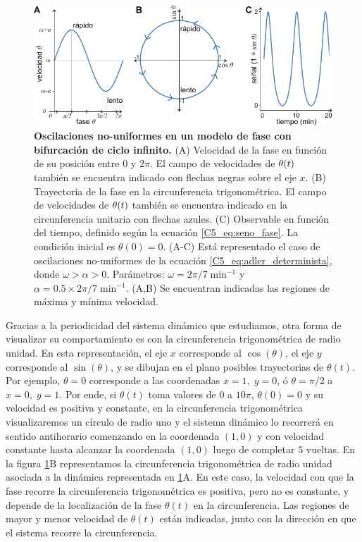\documentclass[./main.tex]{subfiles}
\begin{document}
\begin{figure}
    \centering
    \includegraphics[width=1\columnwidth]{figures/chapter5/C5_determinista_oscilatorio.pdf} 
    \caption{\textbf{Oscilaciones no-uniformes en un modelo de fase con bifurcación de ciclo infinito.} (A) Velocidad de la fase en función de su posición entre $0$ y $2\pi$. El campo de velocidades de $\theta(t)$ también se encuentra indicado con flechas negras sobre el eje $x$. (B) Trayectoria de la fase en la circunferencia trigonométrica. El campo de velocidades de $\theta(t)$ también se encuentra indicado en la circunferencia unitaria con flechas azules. (C) Observable en función del tiempo, definido según la ecuación \ref{C5_eq:seno_fase}. La condición inicial es $\theta(0)= 0$. (A-C) Está representado el caso de oscilaciones no-uniformes de la ecuación \ref{C5_eq:adler_determinista}, donde $\omega > \alpha > 0$. Parámetros: $\omega =2\pi/7 \; \text{min}^{-1}$ y  $\alpha = 0.5 \times 2\pi/7 \; \text{min}^{-1}$. (A,B) Se encuentran indicadas las regiones de máxima y mínima velocidad.}
    \label{C5_fig:adler_determinista_oscilatorio}
\end{figure}


Gracias a la periodicidad del sistema dinámico que estudiamos, otra forma de visualizar su comportamiento es con la circunferencia trigonométrica de radio unidad. En esta representación, el eje $x$ corresponde al $\cos{(\theta)}$, el eje $y$ corresponde al $\sin{(\theta)}$, y se dibujan en el plano posibles trayectorias de $\theta(t)$. Por ejemplo, $\theta = 0$ corresponde a las coordenadas $x=1, \; y=0$, ó $\theta = \pi/2$ a $x=0, \; y=1$. Por ende, si $\theta(t)$ toma valores de $0$ a $10\pi$, $\theta(0) = 0$ y su velocidad es positiva y constante, en la circunferencia trigonométrica visualizaremos un círculo de radio uno y el sistema dinámico lo recorrerá en sentido antihorario comenzando en la coordenada $(1,0)$ y con velocidad constante hasta alcanzar la coordenada $(1,0)$ luego de completar $5$ vueltas. En la figura \ref{C5_fig:adler_determinista_oscilatorio}B representamos la circunferencia trigonométrica de radio unidad asociada a la dinámica representada en \ref{C5_fig:adler_determinista_oscilatorio}A. En este caso, la velocidad con que la fase recorre la circunferencia trigonométrica es positiva, pero no es constante, y depende de la localización de la fase $\theta(t)$ en la circunferencia. Las regiones de mayor y menor velocidad de $\theta(t)$ están indicadas, junto con la dirección en que el sistema recorre la circunferencia. 
\end{document}
